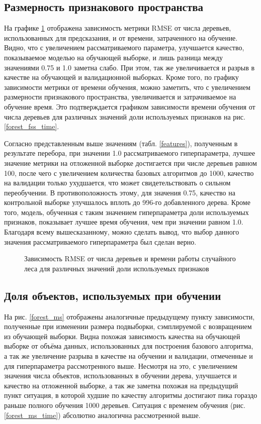 \documentclass[a4paper, 14pt]{article}
\begin{document}
\subsection{Размерность признакового пространства}
    На графике \ref{forest_fss} отображена зависимость метрики RMSE от числа деревьев, использованных для предсказания, и от времени, затраченного на обучение. Видно, что с увеличением рассматриваемого параметра, улучшается качество, показываемое моделью на обучающей выборке, и лишь разница между значениями 0.75 и 1.0 заметна слабо. При этом, так же увеличивается и разрыв в качестве на обучающей и валидационной выборках. Кроме того, по графику зависимости метрики от времени обучения, можно заметить, что с увеличением размерности признакового пространства, увеличивается и затрачиваемое на обучение время. Это подтверждается графиком зависимости времени обучения от числа деревьев для различных значений доли используемых признаков на рис. \ref{forest_fss_time}.

    Согласно представленным выше значениям (табл. \ref{features}), полученным в результате перебора, при значении 1.0 рассматриваемого гиперпараметра, лучшее значение метрики на отложенной выборке достигается при числе деревьев равном 100, после чего с увеличением количества базовых алгоритмов до 1000, качество на валидации только ухудшается, что может свидетельствовать о сильном переобучении. В противоположность этому, для значения 0.75, качество на контрольной выборке улучшалось вплоть до 996-го добавленного дерева. Кроме того, модель, обученная с таким значением гиперпараметра доли используемых признаков, показывает лучшее время обучения, чем при значении равном 1.0. Благодаря всему вышесказанному, можно сделать вывод, что выбор данного значения рассматриваемого гиперпараметра был сделан верно.


    \begin{figure}[h]
      \centering
      
      \caption{Зависимость RMSE от числа деревьев и времени работы случайного леса для различных значений доли используемых признаков}\label{forest_fss}
    \end{figure}

\subsection{Доля объектов, используемых при обучении}


    На рис. \ref{forest_ms} отображены аналогичные предыдущему пункту зависимости, полученные при изменении размера подвыборки, сэмплируемой с возвращением из обучающей выборки. Видна похожая зависимость качества на обучающей выборке от объёма данных, использованных для построения базового алгоритма, а так же увеличение разрыва в качестве на обучении и валидации, отмеченные и для гиперпараметра рассмотренного выше. Несмотря на это, с увеличением значения числа объектов, использованных в обучении дерева, улучшается и качество на отложенной выборке, а так же заметна похожая на предыдущий пункт ситуация, в которой худшие по качеству алгоритмы достигают пика гораздо раньше полного обучения 1000 деревьев. Ситуация с временем обучения (рис. \ref{forest_ms_time}) абсолютно аналогична рассмотренной выше.
    
\end{document}
